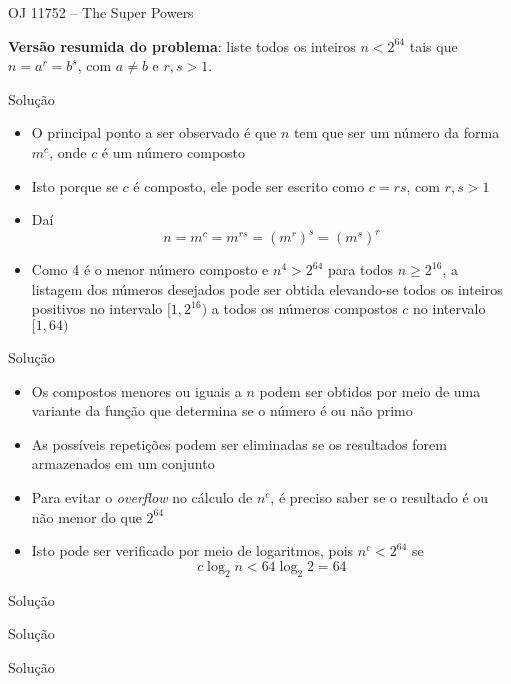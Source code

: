 \begin{frame}[fragile]{OJ 11752 -- The Super Powers}

    \textbf{Versão resumida do problema}: liste todos os inteiros $n < 2^{64}$ tais que $n = a^r
        = b^s$, com $a\neq b$ e $r, s > 1$.

\end{frame}

\begin{frame}[fragile]{Solução}

    \begin{itemize}
        \item O principal ponto a ser observado é que $n$ tem que ser um número da forma
            $m^c$, onde $c$ é um número composto

        \item Isto porque se $c$ é composto, ele pode ser escrito como $c = rs$, com $r, s > 1$

        \item Daí
        $$
            n = m^c = m^{rs} = (m^r)^s = (m^s)^r
        $$

        \item Como 4 é o menor número composto e $n^4 > 2^{64}$ para todos $n \geq 2^{16}$,
            a listagem dos números desejados pode ser obtida elevando-se todos os inteiros
            positivos no intervalo $[1, 2^{16})$ a todos os números compostos $c$ no intervalo
            $[1, 64)$

    \end{itemize}

\end{frame}

\begin{frame}[fragile]{Solução}

    \begin{itemize}
        \item Os compostos menores ou iguais a $n$ podem ser obtidos por meio de uma variante da
        função que determina se o número é ou não primo

        \item As possíveis repetições podem ser eliminadas se os resultados forem armazenados em
            um conjunto

        \item Para evitar o \textit{overflow} no cálculo de $n^c$, é preciso saber se o resultado
            é ou não menor do que $2^{64}$

        \item Isto pode ser verificado por meio de logaritmos, pois $n^c < 2^{64}$ se
        $$
            c\log_2 n < 64\log_2 2 = 64
        $$

    \end{itemize}

\end{frame}

\begin{frame}[fragile]{Solução}
\end{frame}

\begin{frame}[fragile]{Solução}
\end{frame}

\begin{frame}[fragile]{Solução}
\end{frame}
